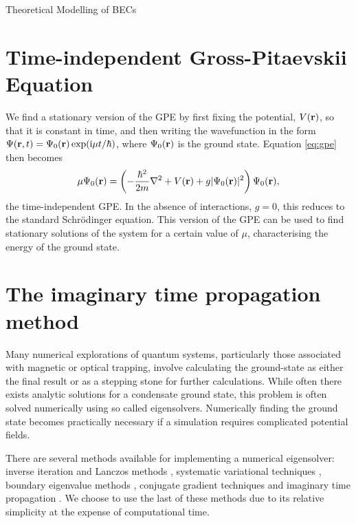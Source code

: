 \begin{chapter}{\label{cha:theoretical_model}Theoretical Modelling of BECs}
\section{\label{section:gpestationary} Time-independent Gross-Pitaevskii Equation}
 We find a stationary version of the GPE by first fixing the potential, $V({\bf r})$, so that it is constant in time, and then writing the wavefunction in the form $\Psi({\bf r},t) = \Psi_0({\bf r}) \exp (\mathrm{i}\mu t / \hbar)$, where $\Psi_0({\bf r})$ is the ground state. Equation \ref{eq:gpe} then becomes
	\begin{equation}\label{eq:stationgpe}
		\mu\Psi_0({\bf r}) = \left( -\frac{\hbar^2}{2m}\nabla^2 + V({\bf r}) + g|\Psi_0({\bf r})|^2  \right) \Psi_0({\bf r}),
	\end{equation}
	the time-independent GPE. In the absence of interactions, $g=0$, this reduces to the standard Schr\"odinger equation. This version of the GPE can be used to find stationary solutions of the system for a certain value of $\mu$, characterising the energy of the ground state.
	
\section{\label{section:imagTime} The imaginary time propagation method}

	Many numerical explorations of quantum systems, particularly those associated with magnetic or optical trapping,  involve calculating the ground-state as either the final result or as a stepping stone for further calculations. While often there exists analytic solutions for a condensate ground state, this problem is often solved numerically using so called eigensolvers. Numerically finding the ground state becomes practically necessary if a simulation requires complicated potential fields.

	There are several methods available for implementing a numerical eigensolver: inverse iteration and Lanczos methods \cite{thijssen1999computational}, systematic variational techniques \cite{Bao2003230}, boundary eigenvalue methods \cite{Edwards95}, conjugate gradient techniques \cite{NumericalRecipes} and imaginary time propagation \cite{PhysRevE.62.7438}. We choose to use the last of these methods due to its relative simplicity at the expense of computational time.


\end{chapter}
